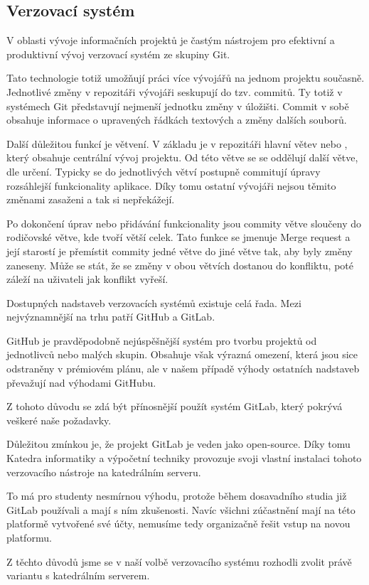 \documentclass[czech,BP]{thesiskiv}
\begin{document}
\subsection{Verzovací systém}
	\par V oblasti vývoje informačních projektů je častým nástrojem pro efektivní a produktivní vývoj verzovací systém ze skupiny Git.
	\par Tato technologie totiž umožňují práci více vývojářů na jednom projektu současně. Jednotlivé změny v repozitáři vývojáři seskupují do tzv. commitů. Ty totiž v systémech Git představují nejmenší jednotku změny v úložišti. Commit v sobě obsahuje informace o upravených řádkách textových a změny dalších souborů.
	\par Další důležitou funkcí je větvení. V základu je v repozitáři hlavní větev  nebo , který obsahuje centrální vývoj projektu. Od této větve se se oddělují další větve, dle určení. Typicky se do jednotlivých větví postupně commitují úpravy rozsáhlejší funkcionality aplikace. Díky tomu ostatní vývojáři nejsou těmito změnami zasaženi a tak si nepřekážejí.
	\par Po dokončení úprav nebo přidávání funkcionality jsou commity větve sloučeny do rodičovské větve, kde tvoří větší celek. Tato funkce se jmenuje Merge request a její starostí je přemístit commity jedné větve do jiné větve tak, aby byly změny zaneseny. Může se stát, že se změny v obou větvích dostanou do konfliktu, poté záleží na uživateli jak konflikt vyřeší.
	\par Dostupných nadstaveb verzovacích systémů existuje celá řada. Mezi nejvýznamnější na trhu patří GitHub a GitLab.
	\par GitHub je pravděpodobně nejúspěšnější systém pro tvorbu projektů od jednotlivců nebo malých skupin. Obsahuje však výrazná omezení, která jsou sice odstraněny v prémiovém plánu, ale v našem případě výhody ostatních nadstaveb převažují nad výhodami GitHubu.
	\par Z tohoto důvodu se zdá být přínosnější použít systém GitLab, který pokrývá veškeré naše požadavky. 
	\par Důležitou zmínkou je, že projekt GitLab je veden jako open-source. Díky tomu Katedra informatiky a výpočetní techniky provozuje svoji vlastní instalaci tohoto verzovacího nástroje na katedrálním serveru.
	\par To má pro studenty nesmírnou výhodu, protože během dosavadního studia již GitLab používali a mají s ním zkušenosti. Navíc všichni zúčastnění mají na této platformě vytvořené své účty, nemusíme tedy organizačně řešit vstup na novou platformu.
	\par Z těchto důvodů jsme se v naší volbě verzovacího systému rozhodli zvolit právě variantu s katedrálním serverem.
\end{document}

